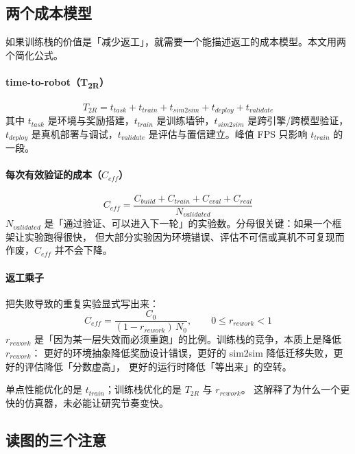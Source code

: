 \documentclass[UTF8, 11pt, a4paper, fontset=windows]{ctexart}
\begin{document}
\subsection{两个成本模型}

如果训练栈的价值是「减少返工」，就需要一个能描述返工的成本模型。本文用两个简化公式。

\paragraph{time-to-robot（T\textsubscript{2R}）}
\begin{equation}
T_{2R} = t_{task} + t_{train} + t_{sim2sim} + t_{deploy} + t_{validate}
\label{eq:t2r}
\end{equation}
其中 $t_{task}$ 是环境与奖励搭建，$t_{train}$ 是训练墙钟，$t_{sim2sim}$ 是跨引擎/跨模型验证，
$t_{deploy}$ 是真机部署与调试，$t_{validate}$ 是评估与置信建立。峰值 FPS 只影响 $t_{train}$ 的一段。

\paragraph{每次有效验证的成本（$C_{eff}$）}
\begin{equation}
C_{eff} = \frac{C_{build} + C_{train} + C_{eval} + C_{real}}{N_{validated}}
\label{eq:ceff}
\end{equation}
$N_{validated}$ 是「通过验证、可以进入下一轮」的实验数。分母很关键：如果一个框架让实验跑得很快，
但大部分实验因为环境错误、评估不可信或真机不可复现而作废，$C_{eff}$ 并不会下降。

\paragraph{返工乘子}
把失败导致的重复实验显式写出来：
\begin{equation}
C_{eff} = \frac{C_0}{(1-r_{rework})\,N_0}, \qquad 0 \le r_{rework} < 1
\label{eq:rework}
\end{equation}
$r_{rework}$ 是「因为某一层失效而必须重跑」的比例。训练栈的竞争，本质上是降低 $r_{rework}$：
更好的环境抽象降低奖励设计错误，更好的 sim2sim 降低迁移失败，更好的评估降低「分数虚高」，
更好的运行时降低「等出来」的空转。

\begin{takeaway}
单点性能优化的是 $t_{train}$；训练栈优化的是 $T_{2R}$ 与 $r_{rework}$。
这解释了为什么一个更快的仿真器，未必能让研究节奏变快。
\end{takeaway}

\subsection{读图的三个注意}
\end{document}

